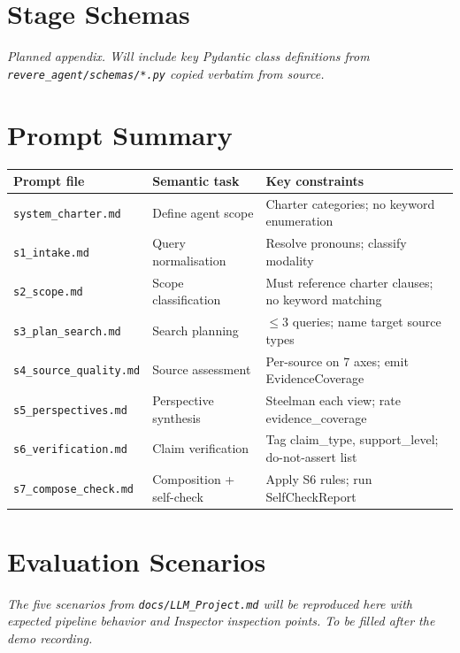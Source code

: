 \documentclass[11pt,letterpaper]{article}
\newcommand{\file}[1]{\texttt{\small #1}}
\newcommand{\provisional}[1]{\textcolor{muted}{\textit{#1}}}
\begin{document}
\appendix

\section{Stage Schemas}
\label{app:schemas}

\provisional{Planned appendix. Will include key Pydantic class definitions
from \file{revere\_agent/schemas/*.py} copied verbatim from source.}

\section{Prompt Summary}
\label{app:prompts}

\begin{center}
\renewcommand{\arraystretch}{1.2}
\begin{tabular}{l p{3.6cm} p{5.8cm}}
\toprule
\textbf{Prompt file} & \textbf{Semantic task} & \textbf{Key constraints} \\
\midrule
\file{system\_charter.md} & Define agent scope & Charter categories; no keyword enumeration \\
\file{s1\_intake.md} & Query normalisation & Resolve pronouns; classify modality \\
\file{s2\_scope.md} & Scope classification & Must reference charter clauses; no keyword matching \\
\file{s3\_plan\_search.md} & Search planning & $\leq$3 queries; name target source types \\
\file{s4\_source\_quality.md} & Source assessment & Per-source on 7 axes; emit EvidenceCoverage \\
\file{s5\_perspectives.md} & Perspective synthesis & Steelman each view; rate evidence\_coverage \\
\file{s6\_verification.md} & Claim verification & Tag claim\_type, support\_level; do-not-assert list \\
\file{s7\_compose\_check.md} & Composition + self-check & Apply S6 rules; run SelfCheckReport \\
\bottomrule
\end{tabular}
\end{center}

\section{Evaluation Scenarios}
\label{app:scenarios}

\provisional{The five scenarios from \file{docs/LLM\_Project.md} will be
reproduced here with expected pipeline behavior and Inspector inspection
points. To be filled after the demo recording.}
\end{document}
